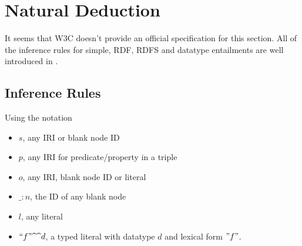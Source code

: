 \documentclass{article}
\begin{document}
\section{Natural Deduction}
It seems that W3C doesn't provide an official specification for this section. All of the inference rules for simple, RDF, RDFS and datatype entailments are well introduced in \cite{book}. 
\subsection{Inference Rules}
Using the notation
\begin{itemize}
\item $s$, any IRI or blank node ID
\item $p$, any IRI for predicate/property in a triple
\item $o$, any IRI, blank node ID or literal
\item $\_:n$, the ID of any blank node
\item $l$, any literal
\item $``f"\text{\textasciicircum \textasciicircum }d$, a typed literal with datatype $d$ and lexical form $"f"$.
\end{itemize}
\end{document}
